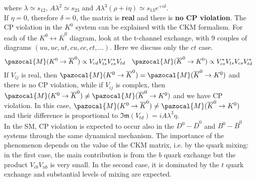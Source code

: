 \documentclass[10.75pt,a4paper,openright,bottom=2cm]{article}
\begin{document}
where $\lambda\simeq s_{12}$, $A\lambda^2\simeq s_{23}$ and $A\lambda^3(\rho+i\eta)\simeq s_{13}e^{+i\delta}$.\\
If $\eta=0$, therefore $\delta=0$, the matrix is \textbf{real} and there is \textbf{no CP violation}. The CP violation in the $K^0$ system can be explained with the CKM formalism. For each of the $K^0\leftrightarrow\overline{K}^0$ diagram, look at the t-channel exchange, with 9 couples of diagrams $(uu,uc,ut,cu,cc,ct,\dots)$. Here we discuss only the $ct$ case.
\[
\pazocal{M}(K^0\to\overline{K}^0)\propto V_{cd}V_{ts}^*V_{cs}^*V_{td} \quad \pazocal{M}(\overline{K}^0\to K^0)\propto V_{cs}^*V_{ts}V_{cs}V_{td}^*
\]
If $V_{ij}$ is real, then $\pazocal{M}(K^0\to\overline{K}^0)=\pazocal{M}(\overline{K}^0\to K^0)$ and there is no CP violation, while if $V_{ij}$ is complex, then $\pazocal{M}(K^0\to\overline{K}^0)\neq\pazocal{M}(\overline{K}^0\to K^0)$ and we have CP violation. In this case, $\pazocal{M}(K^0\to\overline{K}^0)\neq\pazocal{M}(\overline{K}^0\to K^0)$ and their difference is proportional to $\mathfrak{Im}(V_{td})=iA\lambda^3\eta$.\\
In the SM, CP violation is expected to occur also in the $D^0-\overline{D}^0$ and $B^0-\overline{B}^0$ systems through the same dynamical mechanism. The importance of the phenomenon depends on the value of the CKM matrix, i.e. by the quark mixing: in the first case, the main contribution is from the $b$ quark exchange but the product $V_{cb}V_{ub}$ is very small. In the second case, it is dominated by the $t$ quark exchange and substantial levels of mixing are expected.
\end{document}
